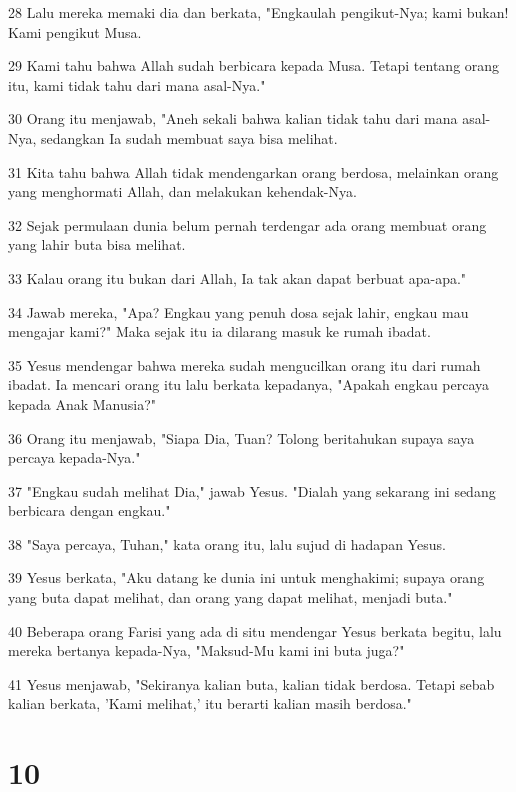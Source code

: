 \par 28 Lalu mereka memaki dia dan berkata, "Engkaulah pengikut-Nya; kami bukan! Kami pengikut Musa.
\par 29 Kami tahu bahwa Allah sudah berbicara kepada Musa. Tetapi tentang orang itu, kami tidak tahu dari mana asal-Nya."
\par 30 Orang itu menjawab, "Aneh sekali bahwa kalian tidak tahu dari mana asal-Nya, sedangkan Ia sudah membuat saya bisa melihat.
\par 31 Kita tahu bahwa Allah tidak mendengarkan orang berdosa, melainkan orang yang menghormati Allah, dan melakukan kehendak-Nya.
\par 32 Sejak permulaan dunia belum pernah terdengar ada orang membuat orang yang lahir buta bisa melihat.
\par 33 Kalau orang itu bukan dari Allah, Ia tak akan dapat berbuat apa-apa."
\par 34 Jawab mereka, "Apa? Engkau yang penuh dosa sejak lahir, engkau mau mengajar kami?" Maka sejak itu ia dilarang masuk ke rumah ibadat.
\par 35 Yesus mendengar bahwa mereka sudah mengucilkan orang itu dari rumah ibadat. Ia mencari orang itu lalu berkata kepadanya, "Apakah engkau percaya kepada Anak Manusia?"
\par 36 Orang itu menjawab, "Siapa Dia, Tuan? Tolong beritahukan supaya saya percaya kepada-Nya."
\par 37 "Engkau sudah melihat Dia," jawab Yesus. "Dialah yang sekarang ini sedang berbicara dengan engkau."
\par 38 "Saya percaya, Tuhan," kata orang itu, lalu sujud di hadapan Yesus.
\par 39 Yesus berkata, "Aku datang ke dunia ini untuk menghakimi; supaya orang yang buta dapat melihat, dan orang yang dapat melihat, menjadi buta."
\par 40 Beberapa orang Farisi yang ada di situ mendengar Yesus berkata begitu, lalu mereka bertanya kepada-Nya, "Maksud-Mu kami ini buta juga?"
\par 41 Yesus menjawab, "Sekiranya kalian buta, kalian tidak berdosa. Tetapi sebab kalian berkata, 'Kami melihat,' itu berarti kalian masih berdosa."

\chapter{10}

